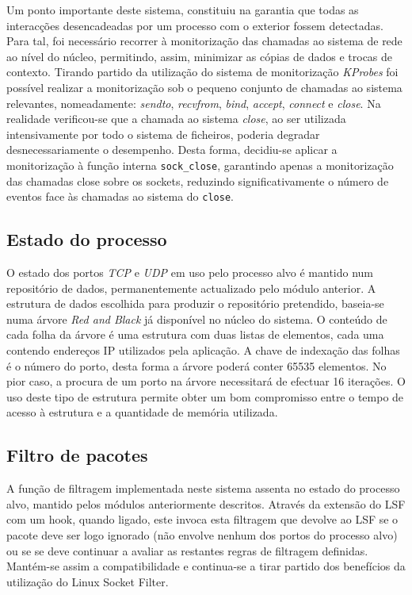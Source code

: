 \documentclass[a4paper]{llncs}
\newcommand{\td}[1]{\todo[inline]{#1}}
\begin{document}
Um ponto importante deste sistema, constituiu na garantia que todas as interacções desencadeadas por um processo com o exterior fossem detectadas.
 Para tal, foi necessário recorrer à monitorização das chamadas ao sistema de rede ao nível do núcleo, permitindo, assim, minimizar as cópias de dados e trocas de contexto.
 Tirando partido da utilização do sistema de monitorização \textit{KProbes} foi possível realizar a monitorização sob o pequeno conjunto de chamadas ao sistema relevantes, nomeadamente: \textit{sendto}, \textit{recvfrom}, \textit{bind}, \textit{accept}, \textit{connect} e \textit{close}.
 Na realidade verificou-se que a chamada ao sistema \textit{close}, ao ser utilizada intensivamente por todo o sistema de ficheiros, poderia degradar desnecessariamente o desempenho.
 Desta forma, decidiu-se aplicar a monitorização à função interna \texttt{sock\_close}, garantindo apenas a monitorização das chamadas close sobre os sockets, reduzindo significativamente o número de eventos face às chamadas ao sistema do \texttt{close}.

\subsection*{Estado do processo}
\label{sub:data_repository}

O estado dos portos \textit{TCP} e \textit{UDP} em uso pelo processo alvo é mantido num repositório de dados, permanentemente actualizado pelo módulo anterior. 
 A estrutura de dados escolhida para produzir o repositório pretendido, baseia-se numa árvore \textit{Red and Black} já disponível no núcleo do sistema.
 O conteúdo de cada folha da árvore é uma estrutura com duas listas de elementos, cada uma contendo endereços IP utilizados pela aplicação.
 A chave de indexação das folhas é o número do porto, desta forma a árvore poderá conter 65535 elementos.
 No pior caso, a procura de um porto na árvore necessitará de efectuar 16 iterações.
  O uso deste tipo de estrutura permite obter um bom compromisso entre o tempo de acesso à estrutura e a quantidade de memória utilizada.


\subsection*{Filtro de pacotes}
\label{sub:packet_filter}

A função de filtragem  implementada neste sistema assenta no estado do processo alvo, mantido pelos módulos anteriormente descritos.
Através da extensão do LSF com um hook, quando ligado, este invoca esta filtragem que devolve ao LSF se o pacote deve ser logo ignorado (não envolve nenhum dos portos do processo alvo) ou se se deve continuar a avaliar as restantes regras de filtragem definidas. Mantém-se assim a compatibilidade e continua-se a tirar partido dos benefícios da utilização do Linux Socket Filter.
\end{document}

